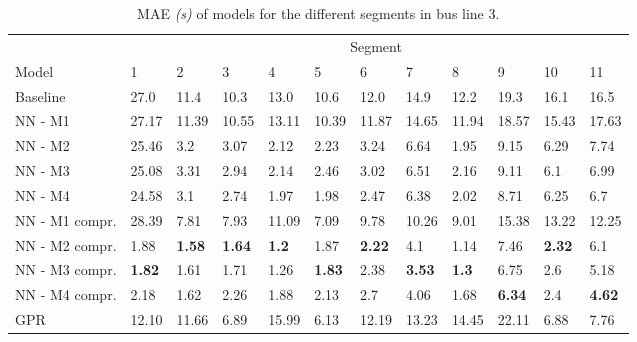 \begin{table}[H]
  \centering
  \caption{MAE \textit{(s)} of models for the different segments in bus line 3.}
  \label{tbl:model-mae-of-segs-203}
  \begin{adjustbox}{center}
	\begin{tabular}{l|l|l|l|l|l|l|l|l|l|l|l}
		& \multicolumn{11}{c}{Segment}                                                                                                                                                  \\
Model          & 1             & 2             & 3             & 4            & 5             & 6             & 7             & 8            & 9             & 10            & 11              \\ 
\hline
Baseline       & 27.0          & 11.4          & 10.3          & 13.0         & 10.6          & 12.0          & 14.9          & 12.2         & 19.3          & 16.1          & 16.5            \\
NN - M1        & 27.17         & 11.39         & 10.55         & 13.11        & 10.39         & 11.87         & 14.65         & 11.94        & 18.57         & 15.43         & 17.63           \\
NN - M2        & 25.46         & 3.2           & 3.07          & 2.12         & 2.23          & 3.24          & 6.64          & 1.95         & 9.15          & 6.29          & 7.74            \\
NN - M3        & 25.08         & 3.31          & 2.94          & 2.14         & 2.46          & 3.02          & 6.51          & 2.16         & 9.11          & 6.1           & 6.99            \\
NN - M4        & 24.58         & 3.1           & 2.74          & 1.97         & 1.98          & 2.47          & 6.38          & 2.02         & 8.71          & 6.25          & 6.7             \\
NN - M1 compr. & 28.39         & 7.81          & 7.93          & 11.09        & 7.09          & 9.78          & 10.26         & 9.01         & 15.38         & 13.22         & 12.25           \\
NN - M2 compr. & 1.88          & \textbf{1.58}         & \textbf{1.64} & \textbf{1.2} & 1.87          & \textbf{2.22} & 4.1           & 1.14         & 7.46          & \textbf{2.32} & 6.1             \\
NN - M3 compr. & \textbf{1.82} & 1.61 & 1.71          & 1.26         & \textbf{1.83} & 2.38          & \textbf{3.53} & \textbf{1.3} & 6.75          & 2.6           & 5.18            \\
NN - M4 compr. & 2.18          & 1.62          & 2.26          & 1.88         & 2.13          & 2.7           & 4.06          & 1.68         & \textbf{6.34} & 2.4           & \textbf{4.62 }  \\
GPR            & 12.10         & 11.66         & 6.89          & 15.99        & 6.13          & 12.19         & 13.23         & 14.45        & 22.11         & 6.88          & 7.76           
\end{tabular}

  \end{adjustbox}
\end{table}

